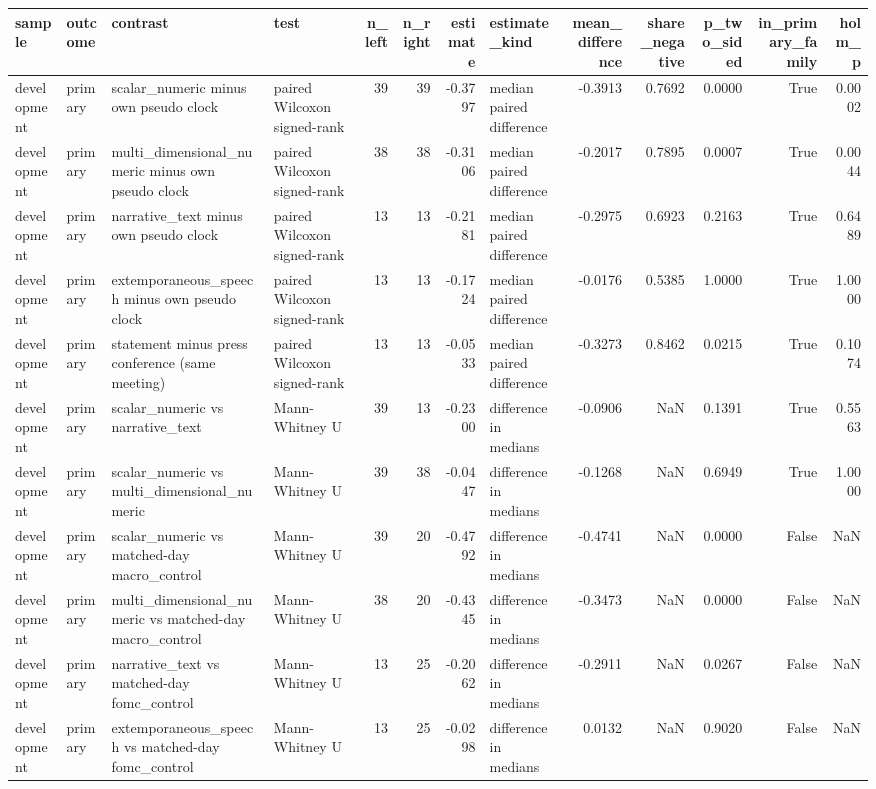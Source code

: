 \begin{tabular}{llllrrrlrrrrr}
\toprule
sample & outcome & contrast & test & n_left & n_right & estimate & estimate_kind & mean_difference & share_negative & p_two_sided & in_primary_family & holm_p \\
\midrule
development & primary & scalar_numeric minus own pseudo clock & paired Wilcoxon signed-rank & 39 & 39 & -0.3797 & median paired difference & -0.3913 & 0.7692 & 0.0000 & True & 0.0002 \\
development & primary & multi_dimensional_numeric minus own pseudo clock & paired Wilcoxon signed-rank & 38 & 38 & -0.3106 & median paired difference & -0.2017 & 0.7895 & 0.0007 & True & 0.0044 \\
development & primary & narrative_text minus own pseudo clock & paired Wilcoxon signed-rank & 13 & 13 & -0.2181 & median paired difference & -0.2975 & 0.6923 & 0.2163 & True & 0.6489 \\
development & primary & extemporaneous_speech minus own pseudo clock & paired Wilcoxon signed-rank & 13 & 13 & -0.1724 & median paired difference & -0.0176 & 0.5385 & 1.0000 & True & 1.0000 \\
development & primary & statement minus press conference (same meeting) & paired Wilcoxon signed-rank & 13 & 13 & -0.0533 & median paired difference & -0.3273 & 0.8462 & 0.0215 & True & 0.1074 \\
development & primary & scalar_numeric vs narrative_text & Mann-Whitney U & 39 & 13 & -0.2300 & difference in medians & -0.0906 & NaN & 0.1391 & True & 0.5563 \\
development & primary & scalar_numeric vs multi_dimensional_numeric & Mann-Whitney U & 39 & 38 & -0.0447 & difference in medians & -0.1268 & NaN & 0.6949 & True & 1.0000 \\
development & primary & scalar_numeric vs matched-day macro_control & Mann-Whitney U & 39 & 20 & -0.4792 & difference in medians & -0.4741 & NaN & 0.0000 & False & NaN \\
development & primary & multi_dimensional_numeric vs matched-day macro_control & Mann-Whitney U & 38 & 20 & -0.4345 & difference in medians & -0.3473 & NaN & 0.0000 & False & NaN \\
development & primary & narrative_text vs matched-day fomc_control & Mann-Whitney U & 13 & 25 & -0.2062 & difference in medians & -0.2911 & NaN & 0.0267 & False & NaN \\
development & primary & extemporaneous_speech vs matched-day fomc_control & Mann-Whitney U & 13 & 25 & -0.0298 & difference in medians & 0.0132 & NaN & 0.9020 & False & NaN \\

\end{tabular}
